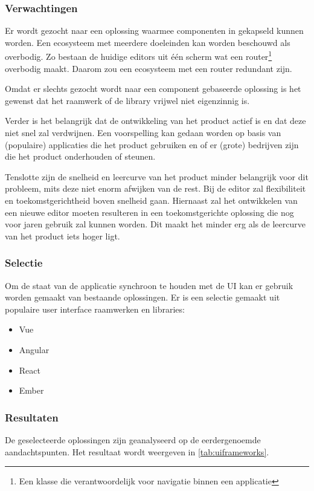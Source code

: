 \subsubsection{Verwachtingen}
Er wordt gezocht naar een oplossing waarmee componenten in gekapseld kunnen worden. Een ecosysteem met meerdere doeleinden kan worden beschouwd als overbodig. Zo bestaan de huidige editors uit één scherm wat een router\footnote{Een klasse die verantwoordelijk voor navigatie binnen een applicatie} overbodig maakt. Daarom zou een ecosysteem met een router redundant zijn.

Omdat er slechts gezocht wordt naar een component gebaseerde oplossing is het gewenst dat het raamwerk of de library vrijwel niet eigenzinnig is.

Verder is het belangrijk dat de ontwikkeling van het product actief is en dat deze niet snel zal verdwijnen. Een voorspelling kan gedaan worden op basis van (populaire) applicaties die het product gebruiken en of er (grote) bedrijven zijn die het product onderhouden of steunen.

Tenslotte zijn de snelheid en leercurve van het product minder belangrijk voor dit probleem, mits deze niet enorm afwijken van de rest. Bij de editor zal flexibiliteit en toekomstgerichtheid boven snelheid gaan. Hiernaast zal het ontwikkelen van een nieuwe editor moeten resulteren in een toekomstgerichte oplossing die nog voor jaren gebruik zal kunnen worden. Dit maakt het minder erg als de leercurve van het product iets hoger ligt.

\subsubsection{Selectie}
Om de staat van de applicatie synchroon te houden met de UI kan er gebruik worden gemaakt van bestaande oplossingen. Er is een selectie gemaakt uit populaire user interface raamwerken en libraries:
\begin{itemize}
    \item Vue
    \item Angular
    \item React
    \item Ember    
\end{itemize}

\pagebreak
\subsubsection{Resultaten}
De geselecteerde oplossingen zijn geanalyseerd op de eerdergenoemde aandachtspunten. Het resultaat wordt weergeven in \autoref{tab:uiframeworks}.

